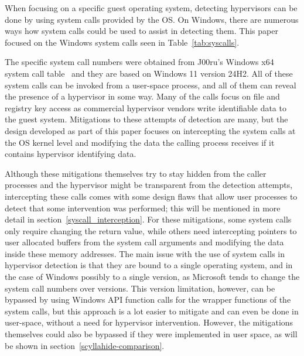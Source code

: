 When focusing on a specific guest operating system, detecting hypervisors can be done by using system calls provided by the OS. 
On Windows, there are numerous ways how system calls could be used to assist in detecting them. This paper focused on the Windows system calls seen in Table~\ref{tab:syscalls}. 

The specific system call numbers were obtained from J00ru's Windows x64 system call table~\cite{j00ruSyscalls} and they are based on Windows 11 version 24H2. All of these system calls can be invoked from a user-space process, and all of them can reveal the presence of a hypervisor in some way. 
Many of the calls focus on file and registry key access as commercial hypervisor vendors write identifiable data to the guest system. 
Mitigations to these attempts of detection are many, but the design developed as part of this paper focuses on intercepting the system calls at the OS kernel level 
and modifying the data the calling process receives if it contains hypervisor identifying data.

Although these mitigations themselves try to stay hidden from the caller processes and the hypervisor might be transparent from the detection attempts, intercepting these calls comes with some design flaws that allow user processes to detect that
some intervention was performed; this will be mentioned in more detail in section~\ref{syscall_interception}.
For these mitigations, some system calls only require changing the return value, while others need intercepting pointers to user allocated buffers from the system call arguments and modifying the data inside these memory addresses.
The main issue with the use of system calls in hypervisor detection is that they are bound to a single operating system, and in the case of Windows possibly to a single version, as Microsoft tends to change the system call numbers over versions.
This version limitation, however, can be bypassed by using Windows API function calls for the wrapper functions of the system calls, but this approach is a lot easier to mitigate and can even be done in user-space, without a need for hypervisor intervention.
However, the mitigations themselves could also be bypassed if they were implemented in user space, as will be shown in section~\ref{scyllahide-comparison}.

